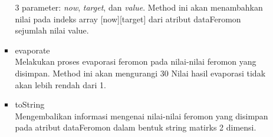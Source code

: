 \begin{itemize}
\begin{itemize}
\begin{itemize}
				3 parameter: \textit{now}, \textit{target}, dan \textit{value}. Method ini akan menambahkan nilai
				pada indeks array [now][target] dari atribut dataFeromon sejumlah nilai value.
				\item evaporate \\
				Melakukan proses evaporasi feromon pada nilai-nilai feromon yang disimpan. Method
				ini akan mengurangi 30%
				Nilai hasil evaporasi tidak akan lebih rendah dari 1.
				\item toString \\
				Mengembalikan informasi mengenai nilai-nilai feromon yang disimpan pada atribut
				dataFeromon dalam bentuk string matirks 2 dimensi.
			\end{itemize}
		\end{itemize}
		

\end{itemize}
